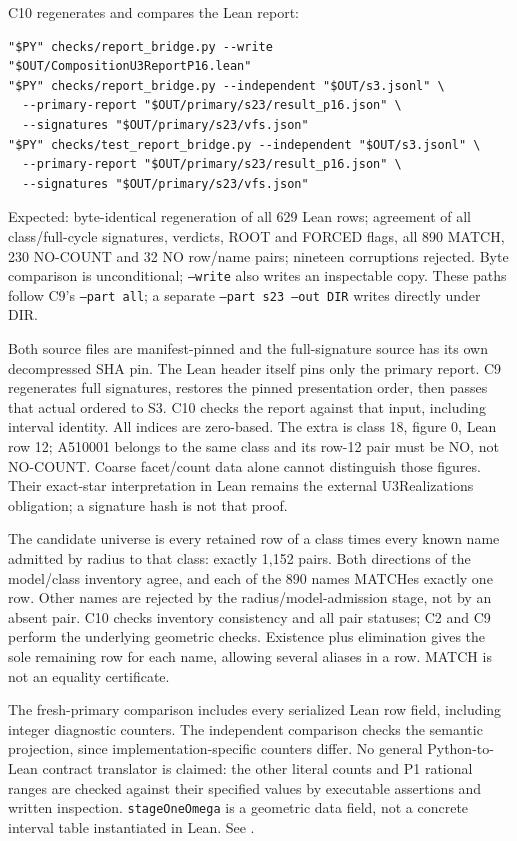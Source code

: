 \documentclass[11pt]{article}
\theoremstyle{definition}
\theoremstyle{remark}
\newcommand{\file}[1]{\path{#1}}
\begin{document}
C10 regenerates and compares the Lean report:
\begin{verbatim}
"$PY" checks/report_bridge.py --write "$OUT/CompositionU3ReportP16.lean"
"$PY" checks/report_bridge.py --independent "$OUT/s3.jsonl" \
  --primary-report "$OUT/primary/s23/result_p16.json" \
  --signatures "$OUT/primary/s23/vfs.json"
"$PY" checks/test_report_bridge.py --independent "$OUT/s3.jsonl" \
  --primary-report "$OUT/primary/s23/result_p16.json" \
  --signatures "$OUT/primary/s23/vfs.json"
\end{verbatim}
Expected: byte-identical regeneration of all 629 Lean rows; agreement of
all class/full-cycle signatures, verdicts, ROOT and FORCED flags, all
890 MATCH, 230 NO-COUNT and 32 NO row/name pairs; nineteen corruptions
rejected. Byte comparison is unconditional; \texttt{--write} also writes
an inspectable copy. These paths follow C9's \texttt{--part all}; a separate
\texttt{--part s23 --out DIR} writes directly under DIR.

Both source files are manifest-pinned and the full-signature source has
its own decompressed SHA pin. The Lean header itself pins only the
primary report. C9 regenerates full signatures, restores the pinned
presentation order, then passes that actual ordered \file{vfs.json} to S3.
C10 checks the report against that input, including interval identity.
All indices are zero-based. The extra is class 18, figure 0, Lean row 12;
A510001 belongs to the same class and its row-12 pair must be NO,
not NO-COUNT. Coarse facet/count data alone cannot distinguish those
figures. Their exact-star interpretation in Lean remains the external
U3Realizations obligation; a signature hash is not that proof.

The candidate universe is every retained row of a class times every known
name admitted by radius to that class: exactly 1,152 pairs. Both directions
of the model/class inventory agree, and each of the 890 names MATCHes
exactly one row. Other names are rejected by the radius/model-admission
stage, not by an absent pair. C10 checks inventory consistency and all
pair statuses; C2 and C9 perform the underlying geometric checks.
Existence plus elimination gives the sole remaining row for each name,
allowing several aliases in a row. MATCH is not an equality certificate.

The fresh-primary comparison includes every serialized Lean row field,
including integer diagnostic counters. The independent comparison checks
the semantic projection, since implementation-specific counters differ.
No general Python-to-Lean contract translator is claimed: the other
literal counts and P1 rational ranges are checked against their specified
values by executable assertions and written inspection.
\texttt{stageOneOmega} is a geometric data field, not a concrete interval
table instantiated in Lean. See \file{data/report-provenance.md}.
\end{document}
